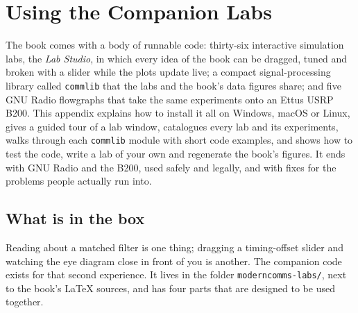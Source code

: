 \chapter{Using the Companion Labs}
\label{appB}

\begin{chapterintro}
The book comes with a body of runnable code: thirty-six interactive simulation labs, the
\emph{Lab Studio}, in which every idea of the book can be dragged, tuned and broken with a slider
while the plots update live; a compact signal-processing library called \texttt{commlib} that the
labs and the book's data figures share; and five GNU Radio flowgraphs that take the same experiments
onto an Ettus USRP B200. This appendix explains how to install it all on Windows, macOS or Linux,
gives a guided tour of a lab window, catalogues every lab and its experiments, walks through each
\texttt{commlib} module with short code examples, and shows how to test the code, write a lab of
your own and regenerate the book's figures. It ends with GNU Radio and the B200, used safely and
legally, and with fixes for the problems people actually run into.
\end{chapterintro}

\section{What is in the box}
\label{sec:appB:overview}

Reading about a matched filter is one thing; dragging a timing-offset slider and watching the eye
diagram close in front of you is another. The companion code exists for that second experience. It
lives in the folder \texttt{moderncomms-labs/}, next to the book's LaTeX sources, and has four parts
that are designed to be used together.

